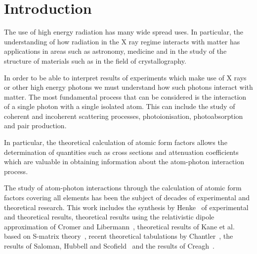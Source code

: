 
\section{Introduction}
The use of high energy radiation has many wide spread uses. In particular,
the understanding of how radiation in the X ray regime interacts with matter 
has applications in areas such as astronomy, medicine and in the study of the
structure of materials such as in the field of crystallography.

In order to be able to interpret results of experiments which make use of X rays
or other high energy photons we must understand how such photons interact with
matter. The most fundamental process that can be considered is the interaction
of a single photon with a single isolated atom. This can include the study of
coherent and incoherent scattering processes, photoionisation, photoabsorption
and pair production.

In particular, the theoretical calculation of atomic form factors allows the
determination of quantities such as cross sections and attenuation coefficients
which are valuable in obtaining information about the atom-photon interaction
process.

The study of atom-photon interactions through the calculation of atomic form
factors covering all elements has been the subject of decades of experimental
and theoretical research. This work includes the synthesis by Henke~\cite{Henke-Experimental}
of experimental and theoretical results, theoretical results using the
relativistic dipole approximation of Cromer and
Libermann~\cite{Cromer-1,Cromer-2,Cromer-3}, theoretical results of Kane et al.
based on S-matrix theory~\cite{Kane-Kissel-Pratt}, recent theoretical
tabulations by Chantler~\cite{Chantler-Tabulation}, the results of
Saloman, Hubbell and Scofield~\cite{Saloman-Hubbell-Scofield} and the results
of Creagh~\cite{Creagh-Hubbell,Creagh-McAuley}.

